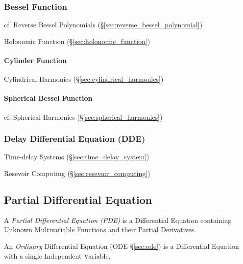 {\subsubsection{Bessel Function}\label{sec:bessel_function}

cf. Reverse Bessel Polynomials (\S\ref{sec:reverse_bessel_polynomial})

\fist Holonomic Function (\S\ref{sec:holonomic_function})



\paragraph{Cylinder Function}\label{sec:cylinder_function}\hfill

\fist Cylindrical Harmonics (\S\ref{sec:cylindrical_harmonics})



\paragraph{Spherical Bessel Function}\label{sec:spherical_bessel}\hfill

\fist cf. Spherical Harmonics (\S\ref{sec:spherical_harmonics})



\subsubsection{Delay Differential Equation (DDE)}\label{sec:dde}

Time-delay Systems (\S\ref{sec:time_delay_system})

Resevoir Computing (\S\ref{sec:resevoir_computing})



\subsection{Partial Differential Equation}\label{sec:pde}

A \emph{Partial Differential Equation (PDE)} is a Differential Equation
containing Unknown Multivariable Functions and their Partial Derivatives.

\fist An \emph{Ordinary} Differential Equation (ODE \S\ref{sec:ode}) is a
Differential Equation with a single Independent Variable.

}
